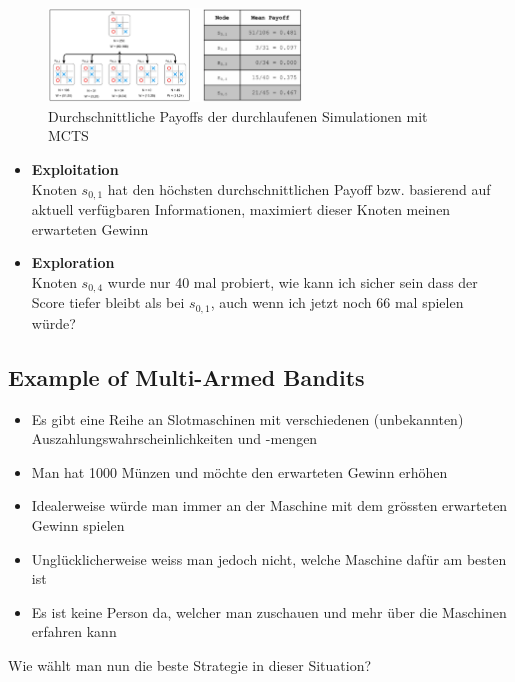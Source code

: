 \documentclass[a4paper]{article}
\begin{document}
		\begin{figure}[htb!]
			\centering
			\includegraphics[width=0.6\textwidth]{img/02_mcts/selection_policy.png}
			\caption{Durchschnittliche Payoffs der durchlaufenen Simulationen mit MCTS}
			\label{fig:02_mcts_selection_policy}
		\end{figure}
		
		\begin{itemize}
			\item \textbf{Exploitation} \\
			Knoten $s_{0,1}$ hat den höchsten durchschnittlichen Payoff bzw. basierend auf aktuell verfügbaren Informationen, maximiert dieser Knoten meinen erwarteten Gewinn
			\item \textbf{Exploration} \\
			Knoten $s_{0,4}$ wurde nur 40 mal probiert, wie kann ich sicher sein dass der Score tiefer bleibt als bei $s_{0,1}$, auch wenn ich jetzt noch 66 mal spielen würde?
		\end{itemize}
	
		\subsection{Example of Multi-Armed Bandits}
		
		\begin{itemize}
			\item Es gibt eine Reihe an Slotmaschinen mit verschiedenen (unbekannten) Auszahlungswahrscheinlichkeiten und -mengen
			\item Man hat 1000 Münzen und möchte den erwarteten Gewinn erhöhen
			\item Idealerweise würde man immer an der Maschine mit dem grössten erwarteten Gewinn spielen
			\item Unglücklicherweise weiss man jedoch nicht, welche Maschine dafür am besten ist
			\item Es ist keine Person da, welcher man zuschauen und mehr über die Maschinen erfahren kann
		\end{itemize}
		\vspace{1em}
		Wie wählt man nun die beste Strategie in dieser Situation?
	
\end{document}
